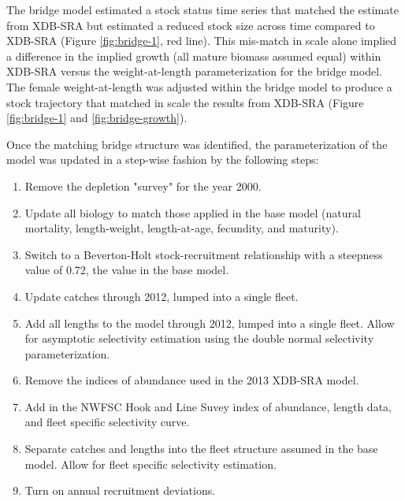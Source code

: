 \documentclass[11pt,
  english,
  a4paper,
]{article}
\begin{document}
\leavevmode\tagmcend\tagstructend\par


The bridge model estimated a stock status time series that matched the estimate from XDB-SRA but estimated a reduced stock size across time compared to XDB-SRA (Figure \ref{fig:bridge-1}, red line). This mis-match in scale alone implied a difference in the implied growth (all mature biomass assumed equal) within XDB-SRA versus the weight-at-length parameterization for the bridge model. The female weight-at-length was adjusted within the bridge model to produce a stock trajectory that matched in scale the results from XDB-SRA (Figure \ref{fig:bridge-1} and \ref{fig:bridge-growth}).

\leavevmode\tagmcend\tagstructend\par


Once the matching bridge structure was identified, the parameterization of the model was updated in a step-wise fashion by the following steps:

\leavevmode\tagmcend\tagstructend\par

\begin{enumerate}
    \item Remove the depletion "survey" for the year 2000.
    \item Update all biology to match those applied in the base model (natural mortality, length-weight, length-at-age, fecundity, and maturity).
    \item Switch to a Beverton-Holt stock-recruitment relationship with a steepness value of 0.72, the value in the base model.
    \item Update catches through 2012, lumped into a single fleet.
    \item Add all lengths to the model through 2012, lumped into a single fleet. Allow for asymptotic selectivity estimation using the double normal selectivity parameterization. 
    \item Remove the indices of abundance used in the 2013 XDB-SRA model.
    \item Add in the NWFSC Hook and Line Suvey index of abundance, length data, and fleet specific selectivity curve.
    \item Separate catches and lengths into the fleet structure assumed in the base model. Allow for fleet specific selectivity estimation.  
    \item Turn on annual recruitment deviations.
\end{enumerate}
\end{document}
